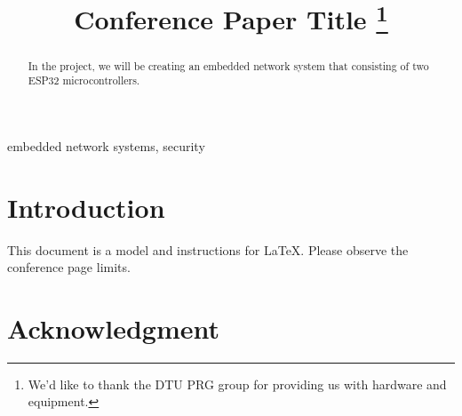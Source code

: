 \documentclass[conference]{IEEEtran}
\begin{document}
\title{Conference Paper Title
\thanks{We'd like to thank the DTU PRG group for providing us with hardware and equipment.}
}

\author{
\and
{}
}

\maketitle

\begin{abstract}
    In the project, we will be creating an embedded network system that consisting of 
    two ESP32\cite{ESP32_Manual} microcontrollers.
\end{abstract}

\begin{IEEEkeywords}
embedded network systems, security
\end{IEEEkeywords}

\section{Introduction}
This document is a model and instructions for \LaTeX.
Please observe the conference page limits. \cite{Schneier_2014}

\section*{Acknowledgment}



\end{document}
